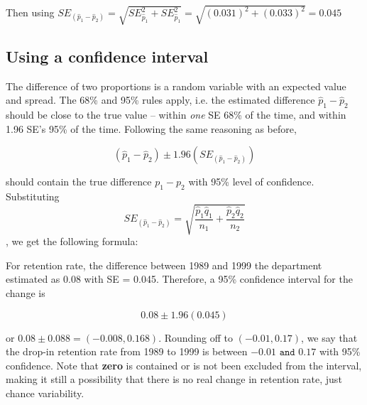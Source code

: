\documentclass[11pt, chapterprefix=true]{scrbook}\usepackage[]{graphicx}\usepackage[]{color}
\begin{document}
\vspace{1cm}

Then using $ SE_{( \hat{p}_1 - \hat{p}_2)} = \sqrt{ SE_{\hat{p}_1}^2 + SE_{\hat{p}_1}^2} = \sqrt{ (0.031)^2 + (0.033)^2} = 0.045 $

\subsection{Using a confidence interval}

The difference of two proportions is a random variable with an expected value and spread.  The 68\% and 95\% rules apply, i.e.  the estimated difference $\hat{p}_1 - \hat{p}_2$ should be close to the true value -- within \textit{one} SE 68\% of the time, and within 1.96 SE's 95\% of the time.  Following the same reasoning as before,

\begin{equation*}
  (\hat{p}_1 - \hat{p}_2) \pm 1.96 (SE_{(\hat{p}_1 - \hat{p}_2)})
\end{equation*}

should contain the true difference $p_1 - p_2$ with 95\% level of confidence.  Substituting
$$ SE_{( \hat{p}_1 - \hat{p}_2)} = \sqrt{ \frac{ \hat{p}_1 \hat{q}_1}{n_1} + \frac{ \hat{p}_2 \hat{q}_2}{n_2}} $$,
we get the following formula:

\begin{center}
\end{center}

For retention rate, the difference between 1989 and 1999 the department estimated as 0.08 with SE = 0.045.  Therefore, a 95\% confidence interval for the change is

\begin{equation*}
0.08 \pm 1.96 (0.045)
\end{equation*}

or $0.08 \pm 0.088 = (-0.008, 0.168)$.  Rounding off to $(-0.01, 0.17)$, we say that the drop-in retention rate from 1989 to 1999 is between $-0.01 \texttt{ and } 0.17$ with 95\% confidence. Note that \textbf{zero} is contained or is not been excluded from the interval, making it still a possibility that there is no real change in retention rate, just chance variability.
\end{document}
